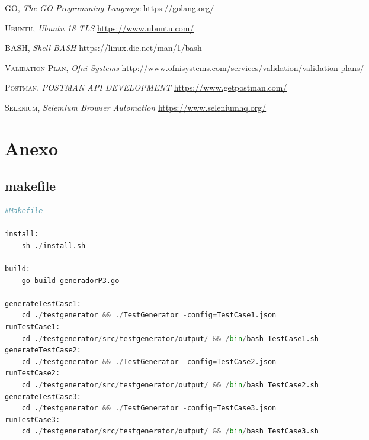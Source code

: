 \documentclass[a4paper,11pt]{book}
\begin{document}
 

\begin{thebibliography}{aaaa}


 \textsc{GO},
\textit{The GO Programming Language}
\url{https://golang.org/} 


 \textsc{Ubuntu},
\textit{Ubuntu 18 TLS}
\url{https://www.ubuntu.com/} 


 \textsc{BASH},
\textit{Shell BASH}
\url{https://linux.die.net/man/1/bash} 


 \textsc{Validation Plan},
\textit{Ofni Systems}
\url{http://www.ofnisystems.com/services/validation/validation-plans/} 

 \textsc{Postman},
\textit{POSTMAN API DEVELOPMENT}
\url{https://www.getpostman.com/} 

 \textsc{Selenium},
\textit{Selemium Browser Automation}
\url{https://www.seleniumhq.org/} 

\end{thebibliography}
 

\chapter{Anexo}

\section{makefile}
\begin{lstlisting}[language=python,caption={makefile }]
#Makefile

install:
	sh ./install.sh

build:
	go build generadorP3.go

generateTestCase1:
	cd ./testgenerator && ./TestGenerator -config=TestCase1.json
runTestCase1:
	cd ./testgenerator/src/testgenerator/output/ && /bin/bash TestCase1.sh 
generateTestCase2:
	cd ./testgenerator && ./TestGenerator -config=TestCase2.json
runTestCase2:
	cd ./testgenerator/src/testgenerator/output/ && /bin/bash TestCase2.sh 
generateTestCase3:
	cd ./testgenerator && ./TestGenerator -config=TestCase3.json
runTestCase3:
	cd ./testgenerator/src/testgenerator/output/ && /bin/bash TestCase3.sh 


\end{lstlisting}



%
%
%
%

%
%

\thispagestyle{empty}
\end{document}
